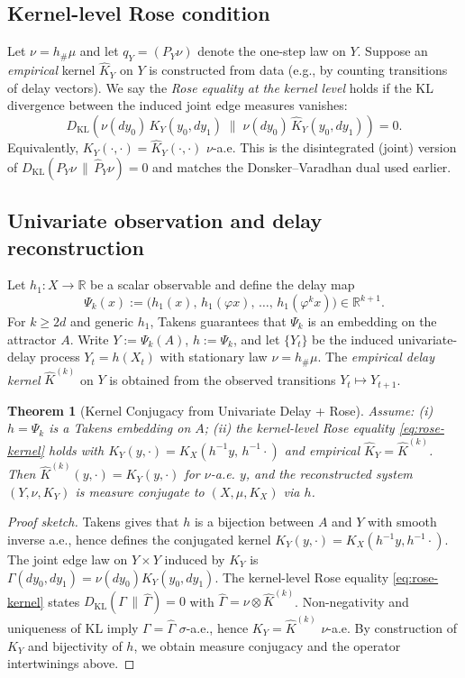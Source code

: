 \documentclass[11pt]{article}
\newtheorem{theorem}{Theorem}
\begin{document}
\subsection{Kernel-level Rose condition}
Let $\nu = h_{\#}\mu$ and let $q_Y = (P_Y\nu)$ denote the one-step law on $Y$. Suppose an \emph{empirical} kernel $\widehat K_Y$ on $Y$ is constructed from data (e.g., by counting transitions of delay vectors). We say the \emph{Rose equality at the kernel level} holds if the KL divergence between the induced joint edge measures vanishes:
\begin{equation}\label{eq:rose-kernel}
  D_{\mathrm{KL}}\!\left(\nu(dy_0)\,K_Y(y_0,dy_1)\;\big\|\; \nu(dy_0)\,\widehat K_Y(y_0,dy_1)\right)=0.
\end{equation}
Equivalently, $K_Y(\cdot,\cdot)=\widehat K_Y(\cdot,\cdot)$ $\nu$-a.e. This is the disintegrated (joint) version of $D_{\mathrm{KL}}(P_Y\nu\,\|\,\widehat P_Y\nu)=0$ and matches the Donsker--Varadhan dual used earlier.

\subsection{Univariate observation and delay reconstruction}
Let $h_1:X\to\mathbb R$ be a scalar observable and define the delay map
\begin{equation}
  \Psi_k(x) := \big(h_1(x),\,h_1(\varphi x),\,\dots,\,h_1(\varphi^{k}x)\big) \in \mathbb R^{k+1}.
\end{equation}
For $k\ge 2d$ and generic $h_1$, Takens guarantees that $\Psi_k$ is an embedding on the attractor $A$. Write $Y:=\Psi_k(A)$, $h:=\Psi_k$, and let $\{Y_t\}$ be the induced univariate-delay process $Y_t=h(X_t)$ with stationary law $\nu=h_{\#}\mu$. The \emph{empirical delay kernel} $\widehat K^{(k)}$ on $Y$ is obtained from the observed transitions $Y_t\mapsto Y_{t+1}$.

\begin{theorem}[Kernel Conjugacy from Univariate Delay + Rose]\label{thm:kernel-conj}
Assume: (i) $h=\Psi_k$ is a Takens embedding on $A$; (ii) the kernel-level Rose equality \eqref{eq:rose-kernel} holds with $K_Y(y,\cdot)=K_X(h^{-1}y,\,h^{-1}\cdot)$ and empirical $\widehat K_Y=\widehat K^{(k)}$. Then $\widehat K^{(k)}(y,\cdot)=K_Y(y,\cdot)$ for $\nu$-a.e. $y$, and the reconstructed system $(Y,\nu, K_Y)$ is measure conjugate to $(X,\mu,K_X)$ via $h$.
\end{theorem}
\begin{proof}[Proof sketch]
Takens gives that $h$ is a bijection between $A$ and $Y$ with smooth inverse a.e., hence defines the conjugated kernel $K_Y(y,\cdot)=K_X(h^{-1}y, h^{-1}\cdot)$. The joint edge law on $Y\times Y$ induced by $K_Y$ is $\Gamma(dy_0,dy_1)=\nu(dy_0)K_Y(y_0,dy_1)$. The kernel-level Rose equality \eqref{eq:rose-kernel} states $D_{\mathrm{KL}}(\Gamma\,\|\,\widehat\Gamma)=0$ with $\widehat\Gamma=\nu\otimes \widehat K^{(k)}$. Non-negativity and uniqueness of KL imply $\Gamma=\widehat\Gamma$ $\sigma$-a.e., hence $K_Y=\widehat K^{(k)}$ $\nu$-a.e. By construction of $K_Y$ and bijectivity of $h$, we obtain measure conjugacy and the operator intertwinings above.
\end{proof}
\end{document}
